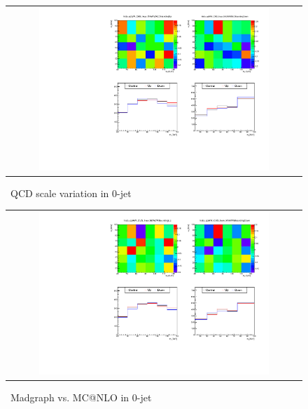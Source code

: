 %
\begin{figure}[htp]
\centering
\begin{tabular}{c}
\includegraphics[width=0.8\textwidth]{figures/histo_qqWW_CMS_hww_MVAWWNLOBounding_0j_zoom.pdf}
\end{tabular}
\caption{ \qqww\ QCD scale variation in 0-jet}
\label{fig:alter_qqwwnlo}
\end{figure}
%
\begin{figure}[htp]
\centering
\begin{tabular}{c}
\includegraphics[width=0.8\textwidth]{figures/histo_qqWW_CMS_hww_MVAWWBounding_0j_zoom.pdf}
\end{tabular}
\caption{ \qqww\ Madgraph vs. MC@NLO in 0-jet}
\label{fig:alter_qqww}
\end{figure}
%
